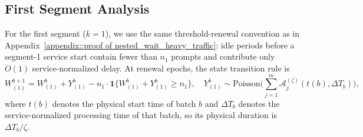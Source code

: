 \subsection{First Segment Analysis}

For the first segment ($k=1$), we use the same threshold-renewal convention as in Appendix~\ref{appendix::proof of nested_wait_heavy_traffic}: idle periods before a segment-1 service start contain fewer than \(n_1\) prompts and contribute only \(O(1)\) service-normalized delay. At renewal epochs, the state transition rule is
$$ W_{(1)}^{b+1} = W_{(1)}^{b} + Y_{(1)}^b  - n_1 \cdot \mathbf{1}\{ W_{(1)}^{b} + Y_{(1)}^b \geq n_1 \},  \quad Y_{(1)}^b \sim \text{Poisson}\Big( \sum_{j=1}^m \mathcal A_j^{(\zeta)}(t(b),\Delta T_b) \Big),  $$
where $t(b)$ denotes the physical start time of batch $b$ and $\Delta T_b$ denotes the service-normalized processing time of that batch, so its physical duration is \(\Delta T_b/\zeta\).

